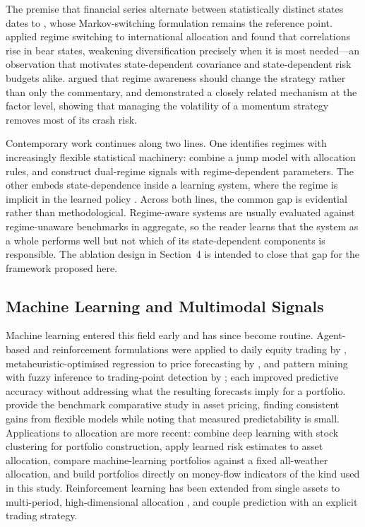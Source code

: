 \documentclass{singlecol-new}
\theoremstyle{TH}{
\newtheorem{lemma}{Lemma}
\newtheorem{theorem}[lemma]{Theorem}
\newtheorem{corrolary}[lemma]{Corrolary}
\newtheorem{conjecture}[lemma]{Conjecture}
\newtheorem{proposition}[lemma]{Proposition}
\newtheorem{claim}[lemma]{Claim}
\newtheorem{stheorem}[lemma]{Wrong Theorem}
\newtheorem{algorithm}{Algorithm}
}
\theoremstyle{THrm}{
\newtheorem{definition}{Definition}[section]
\newtheorem{question}{Question}[section]
\newtheorem{remark}{Remark}
\newtheorem{scheme}{Scheme}
}
\theoremstyle{THhit}{
\newtheorem{case}{Case}[section]
}
\begin{document}
The premise that financial series alternate between statistically distinct states dates
to \citet{hamilton89}, whose Markov-switching formulation remains the reference point.
\citet{angbekaert02} applied regime switching to international allocation and found that
correlations rise in bear states, weakening diversification precisely when it is most
needed---an observation that motivates state-dependent covariance and state-dependent
risk budgets alike. \citet{kritzman12} argued that regime awareness should change the
strategy rather than only the commentary, and \citet{barroso15} demonstrated a
closely related mechanism at the factor level, showing that managing the volatility of
a momentum strategy removes most of its crash risk.

Contemporary work continues along two lines. One identifies regimes with increasingly
flexible statistical machinery: \citet{li25} combine a jump model with allocation
rules, and \citet{luo26} construct dual-regime signals with regime-dependent
parameters. The other embeds state-dependence inside a learning system, where the
regime is implicit in the learned policy \citep{jiang25}. Across both lines, the common
gap is evidential rather than methodological. Regime-aware systems are usually
evaluated against regime-unaware benchmarks in aggregate, so the reader learns that the
system as a whole performs well but not which of its state-dependent components is
responsible. The ablation design in Section~4 is intended to close that gap for the
framework proposed here.

\subsection{Machine Learning and Multimodal Signals}

Machine learning entered this field early and has since become routine. Agent-based
and reinforcement formulations were applied to daily equity trading by \citet{lee07},
metaheuristic-optimised regression to price forecasting by \citet{chou18}, and pattern
mining with fuzzy inference to trading-point detection by \citet{huang20}; each
improved predictive accuracy without addressing what the resulting forecasts imply for a
portfolio. \citet{gu20} provide the benchmark comparative study in asset pricing,
finding consistent gains from flexible models while noting that measured predictability
is small. Applications to allocation
are more recent: \citet{ashrafzadeh25} combine deep learning with stock clustering for
portfolio construction, \citet{agal25} apply learned risk estimates to asset
allocation, \citet{ha26} compare machine-learning portfolios against a fixed
all-weather allocation, and \citet{singsiri26} build portfolios directly on money-flow
indicators of the kind used in this study. Reinforcement learning has been extended from single assets to
multi-period, high-dimensional allocation \citep{jiang25, saijai26}, and
\citet{wang26} couple prediction with an explicit trading strategy.
\end{document}
